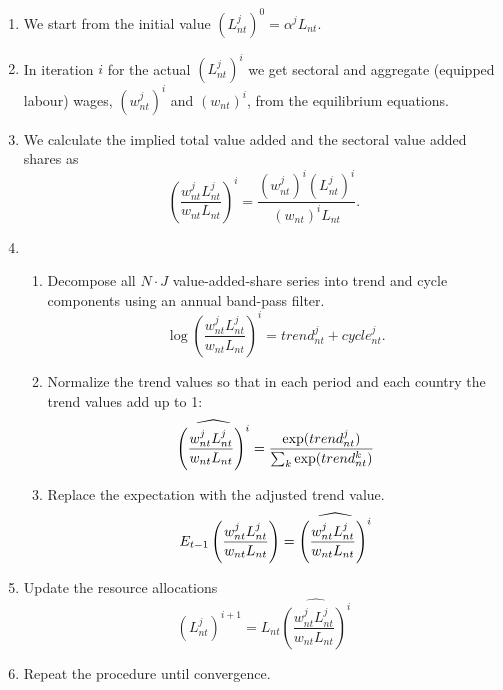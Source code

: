 \documentclass[12pt]{article}
\begin{document}
\begin{enumerate}
\item We start from the initial value $(L_{nt}^j)^0 = \alpha^j L_{nt}$.

\item In iteration $i$ for the actual $(L_{nt}^{j})^{i}$ we get sectoral and
aggregate (equipped labour) wages, $(w_{nt}^{j})^{i}$ and $(w_{nt})^{i}$,
from the equilibrium equations.

\item We calculate the implied total value added and the sectoral value
added shares as 
\begin{equation*}
\left(\frac{w_{nt}^j L_{nt}^j}{w_{nt} L_{nt}}\right)^i = \frac{(w_{nt}^j)^i
(L_{nt}^j)^i}{(w_{nt})^i L_{nt}}.
\end{equation*}

\item 
\begin{enumerate}
\item Decompose all $N\cdot J$ value-added-share series into trend and cycle
components using an annual band-pass filter. 
\begin{equation*}
\log \left( \frac{w_{nt}^{j}L_{nt}^{j}}{w_{nt}L_{nt}}\right)
^{i}=trend_{nt}^{j}+cycle_{nt}^{j}.
\end{equation*}

\item Normalize the trend values so that in each period and each country the
trend values add up to 1: 
\begin{equation*}
\widehat{\left( \frac{w_{nt}^{j}L_{nt}^{j}}{w_{nt}L_{nt}}\right) ^{i}}=\frac{%
\exp (trend_{nt}^{j})}{\sum_{k}\exp (trend_{nt}^{k})}
\end{equation*}

\item Replace the expectation with the adjusted trend value. 
\begin{equation*}
E_{t - 1} \left( \frac{w_{nt}^j L_{nt}^j}{w_{nt} L_{nt}}\right) = \widehat{%
\left(\frac{w_{nt}^j L_{nt}^j}{w_{nt} L_{nt}}\right)^i}
\end{equation*}
\end{enumerate}

\item Update the resource allocations 
\begin{equation*}
(L_{nt}^j)^{i + 1} = L_{nt} \widehat{\left(\frac{w_{nt}^j L_{nt}^j}{w_{nt}
L_{nt}}\right)^i}
\end{equation*}

\item Repeat the procedure until convergence.
\end{enumerate}
\end{document}
